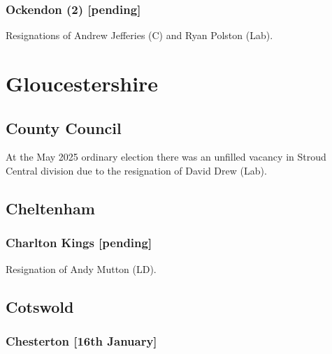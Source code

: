 \documentclass[a4paper,openany]{book}
\begin{document}
\begin{resultsiii}
\subsubsection*{Ockendon (2) \hspace*{\fill}\nolinebreak[1]%
	\enspace\hspace*{\fill}
	[pending]}


Resignations of Andrew Jefferies (C) and Ryan Polston (Lab).

\section{Gloucestershire}

\subsection*{County Council}

At the May 2025 ordinary election there was an unfilled vacancy in Stroud Central division due to the resignation of David Drew (Lab).%

\subsection*{Cheltenham}

\subsubsection*{Charlton Kings \hspace*{\fill}\nolinebreak[1]%
	\enspace\hspace*{\fill}
	[pending]}


Resignation of Andy Mutton (LD).

\subsection*{Cotswold}

\subsubsection*{Chesterton \hspace*{\fill}\nolinebreak[1]%
	\enspace\hspace*{\fill}
	[16th January]}


\end{resultsiii}
\end{document}
